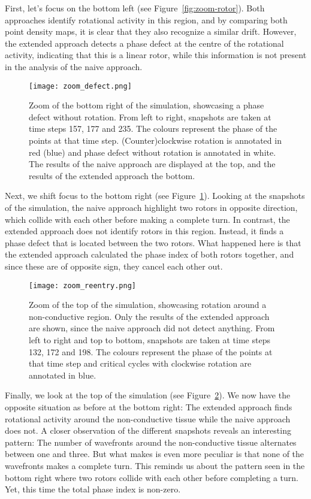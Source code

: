 \documentclass[twocolumn]{article}
\begin{document}
First, let's focus on the bottom left (see Figure~\ref{fig:zoom-rotor}).
Both approaches identify rotational activity in this region, and by
comparing both point density maps, it is clear that they also recognize
a similar drift. However, the extended approach detects a phase defect
at the centre of the rotational activity, indicating that this is a
linear rotor, while this information is not present in the analysis of
the naive approach.

\begin{figure}[ht]
  \centering
  \texttt{[image: zoom\_defect.png]}
  \caption{Zoom of the bottom right of the simulation, showcasing a phase
    defect without rotation. From left to right, snapshots are taken at time
    steps 157, 177 and 235. The colours represent the phase of the points at
    that time step. (Counter)clockwise rotation is annotated in red (blue)
    and phase defect without rotation is annotated in white. The results of
    the naive approach are displayed at the top, and the results of the
  extended approach the bottom.}
  \label{fig:zoom-defect}
\end{figure}

Next, we shift focus to the bottom right (see
Figure~\ref{fig:zoom-defect}). Looking at the snapshots of the simulation,
the naive approach highlight two rotors in opposite direction, which
collide with each other before making a complete turn. In contrast, the
extended approach does not identify rotors in this region. Instead, it
finds a phase defect that is located between the two rotors. What
happened here is that the extended approach calculated the phase index
of both rotors together, and since these are of opposite sign, they
cancel each other out.

\begin{figure}[ht]
  \centering
  \texttt{[image: zoom\_reentry.png]}
  \caption{Zoom of the top of the simulation, showcasing rotation around a
    non-conductive region. Only the results of the extended approach are
    shown, since the naive approach did not detect anything. From left to
    right and top to bottom, snapshots are taken at time steps 132, 172 and
    198. The colours represent the phase of the points at that time step and
  critical cycles with clockwise rotation are annotated in blue.}
  \label{fig:zoom-reentry}
\end{figure}

Finally, we look at the top of the simulation (see
Figure~\ref{fig:zoom-reentry}). We now have the opposite situation as
before at the bottom right: The extended approach finds rotational
activity around the non-conductive tissue while the naive approach does
not. A closer observation of the different snapshots reveals an
interesting pattern: The number of wavefronts around the non-conductive
tissue alternates between one and three. But what makes is even more
peculiar is that none of the wavefronts makes a complete turn. This
reminds us about the pattern seen in the bottom right where two rotors
collide with each other before completing a turn. Yet, this time the
total phase index is non-zero.
\end{document}
